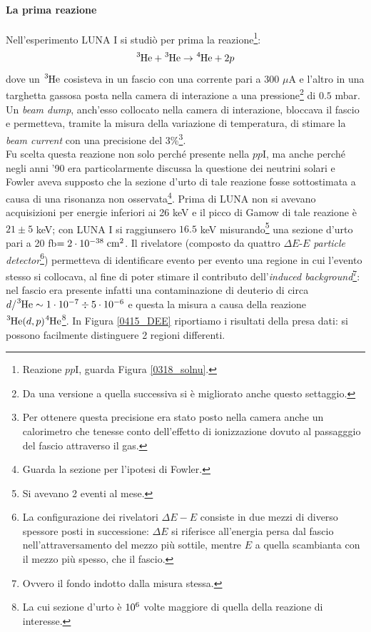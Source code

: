 \paragraph{La prima reazione} Nell'esperimento LUNA I si studiò per prima la reazione\footnote{Reazione $pp$I, guarda Figura \ref{0318_solnu}.}:
$$\ce{^3He} + \ce{^3He} \to \ce{^4He} + 2p$$
dove un $\ce{^3He}$ cosisteva in un fascio con una corrente pari a 300 $\mu$A e l'altro in una targhetta gassosa posta nella camera di interazione a una pressione\footnote{Da una versione a quella successiva si è migliorato anche questo settaggio.} di $0.5$ mbar. Un \textit{beam dump}, anch'esso collocato nella camera di interazione, bloccava il fascio e permetteva, tramite la misura della variazione di temperatura, di stimare la \textit{beam current} con una precisione del 3\%\footnote{Per ottenere questa precisione era stato posto nella camera anche un calorimetro che tenesse conto dell'effetto di ionizzazione dovuto al passagggio del fascio attraverso il gas.}.
\\
\noindent Fu scelta questa reazione non solo perché presente nella $pp$I, ma anche perché negli anni '90 era particolarmente discussa la questione dei neutrini solari e Fowler aveva supposto che la sezione d'urto di tale reazione fosse sottostimata a causa di una risonanza non osservata\footnote{Guarda la sezione  per l'ipotesi di Fowler.}. Prima di LUNA non si avevano acquisizioni per energie inferiori ai 26 keV e il picco di Gamow di tale reazione è $21 \pm 5$ keV; con LUNA I si raggiunsero $16.5$ keV misurando\footnote{Si avevano 2 eventi al mese.} una sezione d'urto pari a 20 fb$= 2\cdot 10^{-38}\;\mbox{cm}^2$. Il rivelatore (composto da quattro $\Delta E$-$E$ \textit{particle detector}\footnote{La configurazione dei rivelatori $\Delta E -E$ consiste in due mezzi di diverso spessore posti in successione: $\Delta E$ si riferisce all'energia persa dal fascio nell'attraversamento del mezzo più sottile, mentre $E$ a quella scambianta con il mezzo più spesso, che  il fascio.}) permetteva di identificare evento per evento una regione in cui l'evento stesso si collocava, al fine di poter stimare il contributo dell'\textit{induced background}\footnote{Ovvero il fondo indotto dalla misura stessa.}: nel fascio era presente infatti una contaminazione di deuterio di circa $d/\ce{^3He}\sim 1\cdot\ord{-7} \div 5\cdot\ord{-6}$ e questa  la misura a causa della reazione $\ce{^3He}(d,p)\ce{^4He}$\footnote{La cui sezione d'urto è $10^{6}$ volte maggiore di quella della reazione di interesse.}. In Figura \ref{0415_DEE} riportiamo i risultati della presa dati: si possono facilmente distinguere 2 regioni differenti. 


